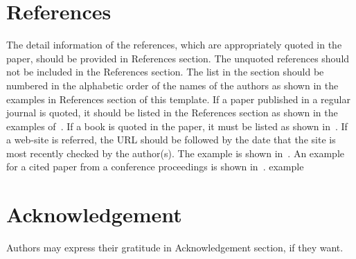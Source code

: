 \documentclass[10pt]{article}
\begin{document}
\section{References}
The detail information of the references, which are appropriately
quoted in the paper, should be provided in References section. The
unquoted references should not be included in the References
section. The list in the section should be numbered in the alphabetic order
of the names of the authors as shown in the examples in References
section of this template. If a paper published in a regular journal is quoted, it should be
listed in the References section as shown in the examples
of~\cite{ref1,ref4}. If a book is quoted in the paper, it must be
listed as shown in~\cite{ref2,ref3}. If a web-site is referred,
the URL should be followed by the date that the site is most
recently checked by the author(s). The example is shown
in~\cite{ref5}. An example for a cited paper from a conference
proceedings is shown in~\cite{ref6}.
example \cite{refefe}


\section*{Acknowledgement}
Authors may express their gratitude in Acknowledgement section, if
they want.





%
%
%
%
%
%
%
\end{document}
